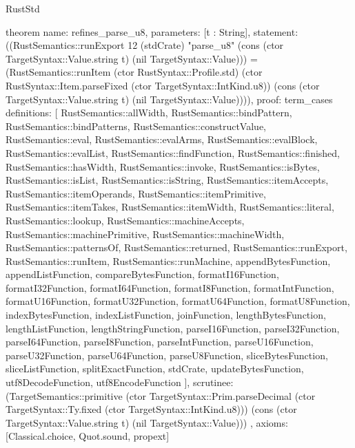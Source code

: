 \begin{lexlean}{RustStd}
\begin{semanticmodule}
theorem{
  name: refines_parse_u8,
  parameters: [t : String],
  statement: ((RustSemantics::runExport 12 (stdCrate) "parse_u8" (cons (ctor TargetSyntax::Value.string t) (nil TargetSyntax::Value))) = (RustSemantics::runItem (ctor RustSyntax::Profile.std) (ctor RustSyntax::Item.parseFixed (ctor TargetSyntax::IntKind.u8)) (cons (ctor TargetSyntax::Value.string t) (nil TargetSyntax::Value)))),
  proof: term_cases{
    definitions: [
      RustSemantics::allWidth,
      RustSemantics::bindPattern,
      RustSemantics::bindPatterns,
      RustSemantics::constructValue,
      RustSemantics::eval,
      RustSemantics::evalArms,
      RustSemantics::evalBlock,
      RustSemantics::evalList,
      RustSemantics::findFunction,
      RustSemantics::finished,
      RustSemantics::hasWidth,
      RustSemantics::invoke,
      RustSemantics::isBytes,
      RustSemantics::isList,
      RustSemantics::isString,
      RustSemantics::itemAccepts,
      RustSemantics::itemOperands,
      RustSemantics::itemPrimitive,
      RustSemantics::itemTakes,
      RustSemantics::itemWidth,
      RustSemantics::literal,
      RustSemantics::lookup,
      RustSemantics::machineAccepts,
      RustSemantics::machinePrimitive,
      RustSemantics::machineWidth,
      RustSemantics::patternsOf,
      RustSemantics::returned,
      RustSemantics::runExport,
      RustSemantics::runItem,
      RustSemantics::runMachine,
      appendBytesFunction,
      appendListFunction,
      compareBytesFunction,
      formatI16Function,
      formatI32Function,
      formatI64Function,
      formatI8Function,
      formatIntFunction,
      formatU16Function,
      formatU32Function,
      formatU64Function,
      formatU8Function,
      indexBytesFunction,
      indexListFunction,
      joinFunction,
      lengthBytesFunction,
      lengthListFunction,
      lengthStringFunction,
      parseI16Function,
      parseI32Function,
      parseI64Function,
      parseI8Function,
      parseIntFunction,
      parseU16Function,
      parseU32Function,
      parseU64Function,
      parseU8Function,
      sliceBytesFunction,
      sliceListFunction,
      splitExactFunction,
      stdCrate,
      updateBytesFunction,
      utf8DecodeFunction,
      utf8EncodeFunction
    ],
    scrutinee: (TargetSemantics::primitive (ctor TargetSyntax::Prim.parseDecimal (ctor TargetSyntax::Ty.fixed (ctor TargetSyntax::IntKind.u8))) (cons (ctor TargetSyntax::Value.string t) (nil TargetSyntax::Value)))
  },
  axioms: [Classical.choice, Quot.sound, propext]
}


\end{semanticmodule}
\end{lexlean}
